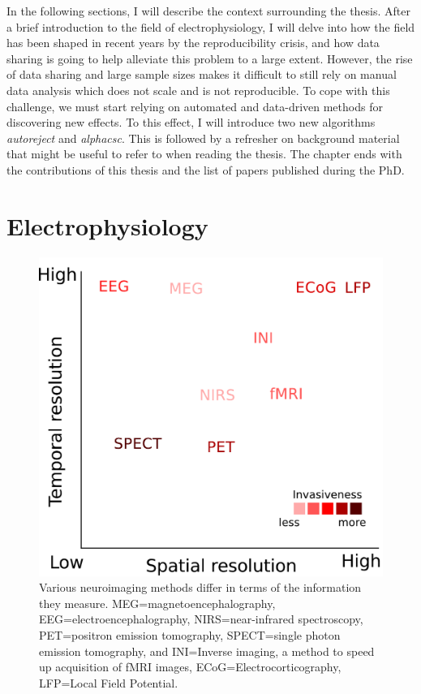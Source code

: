 In the following sections, I will describe the context surrounding the thesis. After a brief introduction to the field of electrophysiology, I will delve into how the field has been shaped in recent years by the reproducibility crisis, and how data sharing is going to help alleviate this problem to a large extent. However, the rise of data sharing and large sample sizes makes it difficult to still rely on manual data analysis which does not scale and is not reproducible. To cope with this challenge, we must start relying on automated and data-driven methods for discovering new effects. To this effect, I will introduce two new algorithms \emph{autoreject} and \emph{alphacsc}. This is followed by a refresher on background material that might be useful to refer to when reading the thesis. The chapter ends with the contributions of this thesis and the list of papers published during the PhD.
 

\section{Electrophysiology}

\begin{figure}[htb]
\begin{center}
   \includegraphics[width=0.5\linewidth]{figures/neuroimaging_methods.pdf}
\end{center}
   \caption[Various neuroimaging methods differ in terms of the information they measure.]{Various neuroimaging methods differ in terms of the information they measure. MEG=magnetoencephalography, EEG=electroencephalography, NIRS=near-infrared spectroscopy, PET=positron emission tomography, SPECT=single photon emission tomography, and INI=Inverse imaging, a method to speed up acquisition of fMRI images, ECoG=Electrocorticography, LFP=Local Field Potential.}
   \label{fig:neuroimaging_methods}
\end{figure}

